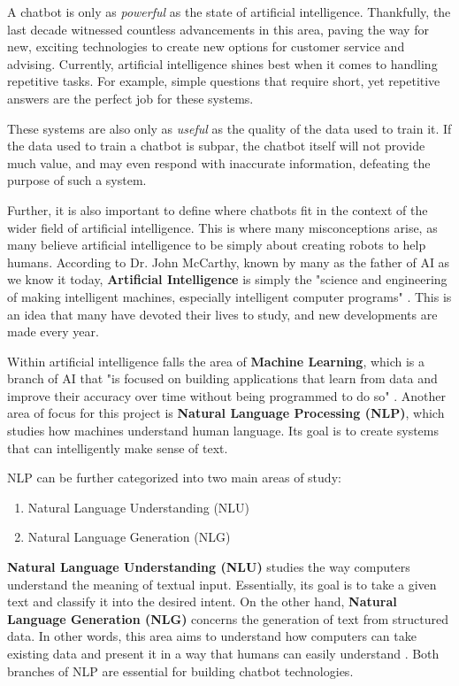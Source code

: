 \documentclass[titlepage, 12pt]{article}
\begin{document}
A chatbot is only as \emph{powerful} as the state of artificial intelligence. Thankfully, the last decade witnessed countless advancements in this area, paving the way for new, exciting technologies to create new options for customer service and advising. Currently, artificial intelligence shines best when it comes to handling repetitive tasks. For example, simple questions that require short, yet repetitive answers are the perfect job for these systems.

These systems are also only as \emph{useful} as the quality of the data used to train it. If the data used to train a chatbot is subpar, the chatbot itself will not provide much value, and may even respond with inaccurate information, defeating the purpose of such a system.

Further, it is also important to define where chatbots fit in the context of the wider field of artificial intelligence. This is where many misconceptions arise, as many believe artificial intelligence to be simply about creating robots to help humans. According to Dr. John McCarthy, known by many as the father of AI as we know it today, \textbf{Artificial Intelligence} is simply the "science and engineering of making intelligent machines, especially intelligent computer programs" \cite{bib-1-8}. This is an idea that many have devoted their lives to study, and new developments are made every year.

Within artificial intelligence falls the area of \textbf{Machine Learning}, which is a branch of AI that "is focused on building applications that learn from data and improve their accuracy over time without being programmed to do so" \cite{bib-1-9}. Another area of focus for this project is \textbf{Natural Language Processing (NLP)}, which studies how machines understand human language. Its goal is to create systems that can intelligently make sense of text.

NLP can be further categorized into two main areas of study:

\begin{enumerate}
    \item Natural Language Understanding (NLU)
    \item Natural Language Generation (NLG)
\end{enumerate}

\textbf{Natural Language Understanding (NLU)} studies the way computers understand the meaning of textual input. Essentially, its goal is to take a given text and classify it into the desired intent. On the other hand, \textbf{Natural Language Generation (NLG)} concerns the generation of text from structured data. In other words, this area aims to understand how computers can take existing data and present it in a way that humans can easily understand \cite{bib-1-10}. Both branches of NLP are essential for building chatbot technologies.
\end{document}
